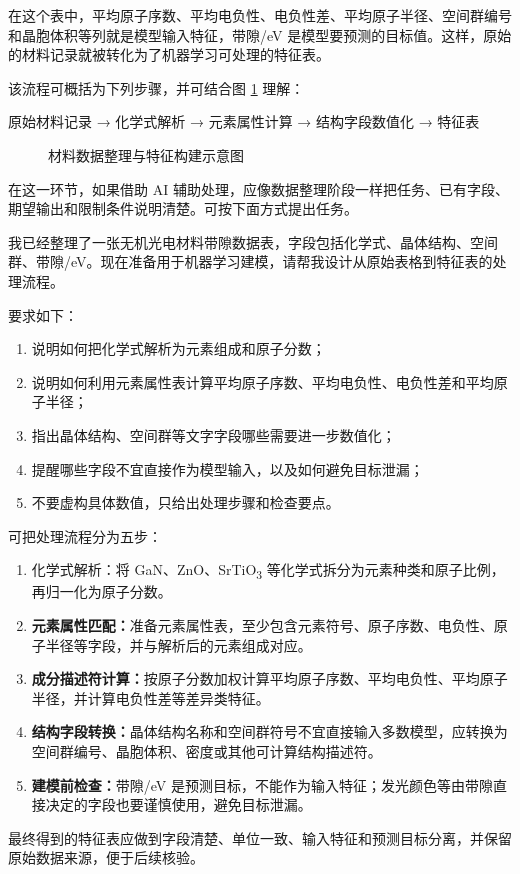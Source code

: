 在这个表中，平均原子序数、平均电负性、电负性差、平均原子半径、空间群编号和晶胞体积等列就是模型输入特征，带隙/eV 是模型要预测的目标值。这样，原始的材料记录就被转化为了机器学习可处理的特征表。


该流程可概括为下列步骤，并可结合图 \ref{fig:materials-data-feature} 理解：


\begin{lightquote}
\centering 原始材料记录 → 化学式解析 → 元素属性计算 → 结构字段数值化 → 特征表
\end{lightquote}

\begin{figure}[H]
\centering
{}
\caption{材料数据整理与特征构建示意图}
\label{fig:materials-data-feature}
\end{figure}
\FloatBarrier

在这一环节，如果借助 AI 辅助处理，应像数据整理阶段一样把任务、已有字段、期望输出和限制条件说明清楚。可按下面方式提出任务。

\begin{samepage}
\begin{userbox}
我已经整理了一张无机光电材料带隙数据表，字段包括化学式、晶体结构、空间群、带隙/eV。现在准备用于机器学习建模，请帮我设计从原始表格到特征表的处理流程。

要求如下：
\begin{enumerate}
\item 说明如何把化学式解析为元素组成和原子分数；
\item 说明如何利用元素属性表计算平均原子序数、平均电负性、电负性差和平均原子半径；
\item 指出晶体结构、空间群等文字字段哪些需要进一步数值化；
\item 提醒哪些字段不宜直接作为模型输入，以及如何避免目标泄漏；
\item 不要虚构具体数值，只给出处理步骤和检查要点。
\end{enumerate}
\end{userbox}

\begin{aibox}
可把处理流程分为五步：

\begin{enumerate}
\item 化学式解析：将 GaN、ZnO、SrTiO\textsubscript{3} 等化学式拆分为元素种类和原子比例，再归一化为原子分数。
\item \textbf{元素属性匹配：}准备元素属性表，至少包含元素符号、原子序数、电负性、原子半径等字段，并与解析后的元素组成对应。
\item \textbf{成分描述符计算：}按原子分数加权计算平均原子序数、平均电负性、平均原子半径，并计算电负性差等差异类特征。
\item \textbf{结构字段转换：}晶体结构名称和空间群符号不宜直接输入多数模型，应转换为空间群编号、晶胞体积、密度或其他可计算结构描述符。
\item \textbf{建模前检查：}带隙/eV 是预测目标，不能作为输入特征；发光颜色等由带隙直接决定的字段也要谨慎使用，避免目标泄漏。
\end{enumerate}

最终得到的特征表应做到字段清楚、单位一致、输入特征和预测目标分离，并保留原始数据来源，便于后续核验。
\end{aibox}
\end{samepage}

